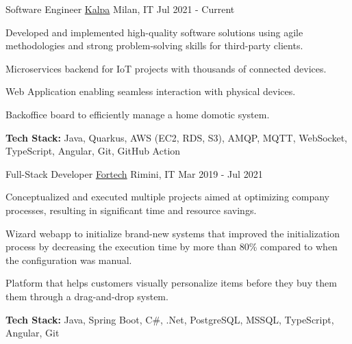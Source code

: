 

\begin{cventries}

  \cventry
    {Software Engineer} %
    {\href{http://www.kalpa.it}{Kalpa}} %
    {Milan, IT} %
    {Jul 2021 - Current} %
    {
      \begin{cvitems} %
        \item {Developed and implemented high-quality software solutions using agile methodologies and strong problem-solving skills for third-party clients.}
        \item {Microservices backend for IoT projects with thousands of connected devices.}
        \item {Web Application enabling seamless interaction with physical devices.}
        \item {Backoffice board to efficiently manage a home domotic system.}
        \item {\textbf{Tech Stack:} Java, Quarkus, AWS (EC2, RDS, S3), AMQP, MQTT, WebSocket, TypeScript, Angular, Git, GitHub Action}
      \end{cvitems}
    }

  \cventry
    {Full-Stack Developer} %
    {\href{http://www.fortech.it}{Fortech}} %
    {Rimini, IT} %
    {Mar 2019 - Jul 2021} %
    {
      \begin{cvitems} %
        \item {Conceptualized and executed multiple projects aimed at optimizing company processes, resulting in significant time and resource savings.}
        \item {Wizard webapp to initialize brand-new systems that improved the initialization process by decreasing the execution time by more than 80\% compared to when the configuration was manual.}
        \item {Platform that helps customers visually personalize items before they buy them them through a drag-and-drop system.}
        \item {\textbf{Tech Stack:} Java, Spring Boot, C\#, .Net,  PostgreSQL, MSSQL, TypeScript, Angular, Git}
      \end{cvitems}
    }

\end{cventries}
